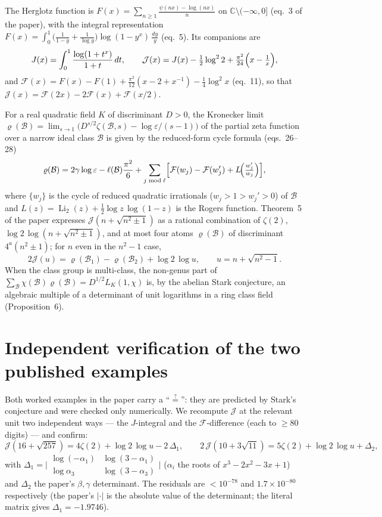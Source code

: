 \documentclass[11pt]{article}
\newcommand{\Jc}{\mathcal{J}}
\newcommand{\Fc}{\mathcal{F}}
\newcommand{\Li}{\operatorname{Li}}
\newcommand{\rhoB}{\varrho}
\begin{document}
The Herglotz function is $F(x)=\sum_{n\ge1}\frac{\psi(nx)-\log(nx)}{n}$ on
$\mathbb C\setminus(-\infty,0]$ (eq.~3 of the paper), with the integral
representation $F(x)=\int_0^1\!\bigl(\tfrac1{1-y}+\tfrac1{\log y}\bigr)
\log(1-y^x)\,\tfrac{dy}{y}$ (eq.~5). Its companions are
\[
  J(x)=\int_0^1\frac{\log(1+t^x)}{1+t}\,dt,\qquad
  \Jc(x)=J(x)-\tfrac12\log^2 2+\tfrac{\pi^2}{24}\Bigl(x-\tfrac1x\Bigr),
\]
and $\Fc(x)=F(x)-F(1)+\tfrac{\pi^2}{12}(x-2+x^{-1})-\tfrac14\log^2 x$
(eq.~11), so that $\Jc(x)=\Fc(2x)-2\Fc(x)+\Fc(x/2)$.

For a real quadratic field $K$ of discriminant $D>0$, the Kronecker limit
$\rhoB(\mathcal B)=\lim_{s\to1}\bigl(D^{s/2}\zeta(\mathcal B,s)-\log\varepsilon/(s-1)\bigr)$
of the partial zeta function over a narrow ideal class $\mathcal B$ is given by
the reduced-form cycle formula (eqs.~26--28)
\begin{equation}\label{eq:rho}
  \rhoB(\mathcal B)=2\gamma\log\varepsilon-\ell(\mathcal B)\frac{\pi^2}{6}
     +\sum_{j\bmod\ell}\Bigl[\Fc(w_j)-\Fc(w_j')+L\!\Bigl(\tfrac{w_j'}{w_j}\Bigr)\Bigr],
\end{equation}
where $\{w_j\}$ is the cycle of reduced quadratic irrationals
($w_j>1>w_j'>0$) of $\mathcal B$ and $L(z)=\Li_2(z)+\tfrac12\log z\,\log(1-z)$ is
the Rogers function. Theorem~5 of the paper expresses
$\Jc(n+\sqrt{n^2\pm1})$ as a rational combination of $\zeta(2)$,
$\log2\,\log(n+\sqrt{n^2\pm1})$, and at most four atoms $\rhoB(\mathcal B)$ of
discriminant $4^a(n^2\pm1)$; for $n$ even in the $n^2-1$ case,
\begin{equation}\label{eq:thm5even}
  2\Jc(u)=\rhoB(\mathcal B_1)-\rhoB(\mathcal B_2)+\log2\,\log u,\qquad
  u=n+\sqrt{n^2-1}.
\end{equation}
When the class group is multi-class, the non-genus part of
$\sum_{\mathcal B}\chi(\mathcal B)\rhoB(\mathcal B)=D^{1/2}L_K(1,\chi)$ is, by the
abelian Stark conjecture, an algebraic multiple of a determinant of unit
logarithms in a ring class field (Proposition~6).

\section{Independent verification of the two published examples}

Both worked examples in the paper carry a ``$\stackrel{?}{=}$'': they are
predicted by Stark's conjecture and were checked only numerically. We recompute
$\Jc$ at the relevant unit two independent ways --- the $J$-integral and the
$\Fc$-difference (each to $\ge80$ digits) --- and confirm:
\[
  \Jc(16+\sqrt{257})=4\zeta(2)+\log2\,\log u-2\,\Delta_1,\qquad
  2\,\Jc(10+3\sqrt{11})=5\zeta(2)+\log2\,\log u+\Delta_2,
\]
with $\Delta_1=\bigl|\begin{smallmatrix}\log(-\alpha_1)&\log(3-\alpha_1)\\
\log\alpha_3&\log(3-\alpha_3)\end{smallmatrix}\bigr|$ ($\alpha_i$ the roots of
$x^3-2x^2-3x+1$) and $\Delta_2$ the paper's $\beta,\gamma$ determinant. The
residuals are $<10^{-78}$ and $1.7\times10^{-80}$ respectively (the paper's
$|\cdot|$ is the absolute value of the determinant; the literal matrix gives
$\Delta_1=-1.9746$).
\end{document}

